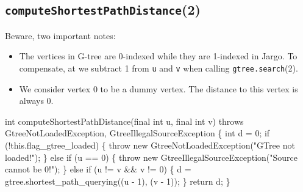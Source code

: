 \subsection{\texttt{computeShortestPathDistance}(2)}
Beware, two important notes:
\begin{itemize}
\item The vertices in G-tree are 0-indexed while they are 1-indexed in Jargo.
To compensate, at we subtract 1 from {\tt{}u} and {\tt{}v} when calling
{\tt{}gtree.search}(2).
\item We consider vertex 0 to be a dummy vertex. The distance to this vertex
is always 0.
\end{itemize}
\nwenddocs{}\endmoddef{}
int computeShortestPathDistance(final int u, final int v)
throws GtreeNotLoadedException, GtreeIllegalSourceException \{
  int d = 0;
  if (!this.flag_gtree_loaded) \{
    throw new GtreeNotLoadedException("GTree not loaded!");
  \} else if (u == 0) \{
    throw new GtreeIllegalSourceException("Source cannot be 0!");
  \} else if (u != v && v != 0) \{
    d = gtree.shortest_path_querying((u - 1), (v - 1));
  \}
  return d;
\}
\eatline
{}\nwendcode{}\nwdocspar
